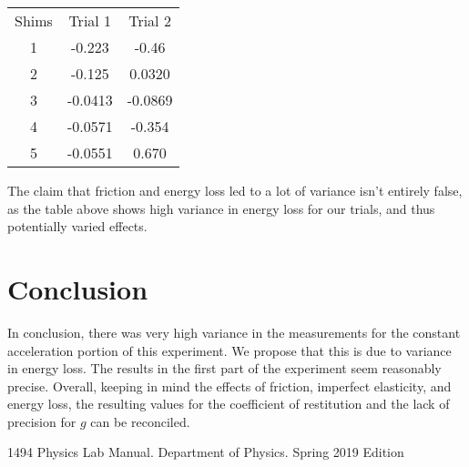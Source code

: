 \documentclass[journal,transmag]{IEEEtran}
\begin{document}
\begin{center}
\begin{tabular}{ c |c c}
Shims & Trial 1 & Trial 2 \\
1 & -0.223& 	-0.46\\
2& -0.125&	0.0320\\
3& -0.0413&	-0.0869\\
4& -0.0571&	-0.354\\
5& -0.0551&	0.670\\
\end{tabular}
\end{center}

The claim that friction and energy loss led to a lot of variance isn't entirely false, as the table above shows high variance in energy loss for our trials, and thus potentially varied effects.
\section{Conclusion}
\indent In conclusion, there was very high variance in the measurements for the constant acceleration portion of this experiment. We propose that this is due to variance in energy loss. The results in the first part of the experiment seem reasonably precise. Overall, keeping in mind the effects of friction, imperfect elasticity, and energy loss, the resulting values for the coefficient of restitution and the lack of precision for $g$ can be reconciled.




\begin{thebibliography}{1}
1494 Physics Lab Manual. Department of Physics. Spring 2019 Edition

\end{thebibliography}
\end{document}
